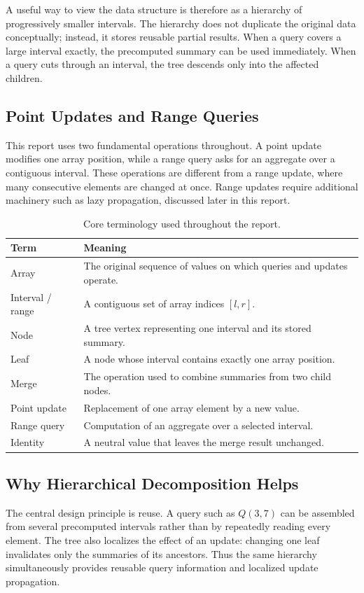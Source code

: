 \documentclass[11pt,open=any,headings=option]{scrreprt}
\begin{document}
A useful way to view the data structure is therefore as a hierarchy of progressively smaller intervals. The hierarchy does not duplicate the original data conceptually; instead, it stores reusable partial results. When a query covers a large interval exactly, the precomputed summary can be used immediately. When a query cuts through an interval, the tree descends only into the affected children.

\subsection{Point Updates and Range Queries}
This report uses two fundamental operations throughout. A point update modifies one array position, while a range query asks for an aggregate over a contiguous interval. These operations are different from a range update, where many consecutive elements are changed at once. Range updates require additional machinery such as lazy propagation, discussed later in this report.

\begin{table}[H]
\centering
\caption{Core terminology used throughout the report.}
\label{tab:terminology}
\begin{tabular}{>{\raggedright\arraybackslash}p{3.1cm}p{9.2cm}}
\toprule
\textbf{Term} & \textbf{Meaning}\\
\midrule
Array & The original sequence of values on which queries and updates operate.\\
Interval / range & A contiguous set of array indices $[l,r]$.\\
Node & A tree vertex representing one interval and its stored summary.\\
Leaf & A node whose interval contains exactly one array position.\\
Merge & The operation used to combine summaries from two child nodes.\\
Point update & Replacement of one array element by a new value.\\
Range query & Computation of an aggregate over a selected interval.\\
Identity & A neutral value that leaves the merge result unchanged.\\
\bottomrule
\end{tabular}
\end{table}

\subsection{Why Hierarchical Decomposition Helps}
The central design principle is reuse. A query such as $Q(3,7)$ can be assembled from several precomputed intervals rather than by repeatedly reading every element. The tree also localizes the effect of an update: changing one leaf invalidates only the summaries of its ancestors. Thus the same hierarchy simultaneously provides reusable query information and localized update propagation.
\end{document}
